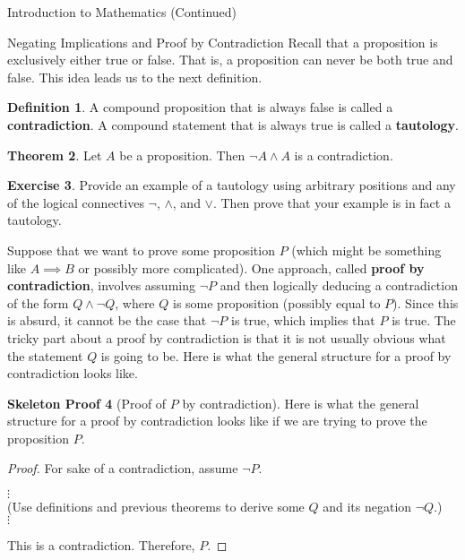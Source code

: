 \documentclass[11pt]{article}
\theoremstyle{definition}
\newtheorem{theorem}{Theorem}[section]
\newtheorem{definition}[theorem]{Definition}
\newtheorem{exercise}[theorem]{Exercise}
\newtheorem{skeleton}[theorem]{Skeleton Proof}
\newenvironment{textbox}{\noindent\begin{lrbox}{\savepar}\begin{minipage}[c]{.98\textwidth}}{\end{minipage}\end{lrbox}\fcolorbox{black}{white}{\usebox{\savepar}}}
\begin{document}
\begin{section}{Introduction to Mathematics (Continued)}
\begin{subsection}{Negating Implications and Proof by Contradiction}
Recall that a proposition is exclusively either true or false.  That is, a proposition can never be both true and false.  This idea leads us to the next definition.

\begin{definition}
A compound proposition that is always false is called a \textbf{contradiction}.  A compound statement that is always true is called a \textbf{tautology}.
\end{definition}

\begin{theorem}
Let $A$ be a proposition. Then $\neg A\wedge A$ is a contradiction.
\end{theorem}

\begin{exercise}
Provide an example of a tautology using arbitrary positions and any of the logical connectives $\neg$, $\wedge$, and $\vee$.  Then prove that your example is in fact a tautology.
\end{exercise}

Suppose that we want to prove some proposition $P$ (which might be something like $A\implies B$ or possibly more complicated).  One approach, called \textbf{proof by contradiction}, involves assuming $\neg P$ and then logically deducing a contradiction of the form $Q\wedge \neg Q$, where $Q$ is some proposition (possibly equal to $P$).  Since this is absurd, it cannot be the case that $\neg P$ is true, which implies that $P$ is true.  The tricky part about a proof by contradiction is that it is not usually obvious what the statement $Q$ is going to be.  Here is what the general structure for a proof by contradiction looks like.

\bigskip

\begin{skeleton}[Proof of $P$ by contradiction]
Here is what the general structure for a proof by contradiction looks like if we are trying to prove the proposition $P$.

\bigskip

\begin{textbox}
\begin{proof}
For sake of a contradiction, assume $\neg P$.
\begin{center}
$\vdots$\\
(Use definitions and previous theorems to derive some $Q$ and its negation $\neg Q$.)\\
$\vdots$
\end{center}
\noindent This is a contradiction.  Therefore, $P$.
\end{proof}
\end{textbox}


\end{skeleton}
\end{subsection}
\end{section}
\end{document}
